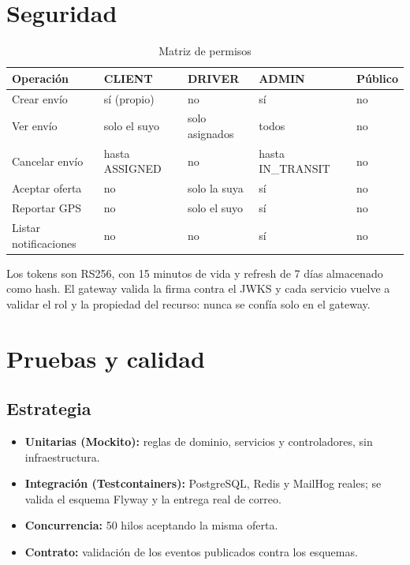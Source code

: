 \documentclass[conference]{IEEEtran}
\begin{document}
\section{Seguridad}

\begin{table}[t]
\centering
\caption{Matriz de permisos}
\small
\begin{tabular}{@{}L{5.6cm}L{2.2cm}L{2.2cm}L{2.2cm}L{2.2cm}@{}}
\toprule
\textbf{Operación} & \textbf{CLIENT} & \textbf{DRIVER} & \textbf{ADMIN} & \textbf{Público}\\
\midrule
Crear envío & sí (propio) & no & sí & no\\
Ver envío & solo el suyo & solo asignados & todos & no\\
Cancelar envío & hasta ASSIGNED & no & hasta IN\_TRANSIT & no\\
Aceptar oferta & no & solo la suya & sí & no\\
Reportar GPS & no & solo el suyo & sí & no\\
Listar notificaciones & no & no & sí & no\\
\bottomrule
\end{tabular}
\end{table}

Los tokens son RS256, con 15 minutos de vida y refresh de 7 días almacenado como hash. El gateway
valida la firma contra el JWKS y cada servicio vuelve a validar el rol y la propiedad del recurso:
nunca se confía solo en el gateway.

\clearpage
\section{Pruebas y calidad}

\subsection{Estrategia}

\begin{itemize}[leftmargin=1.2cm]
  \item \textbf{Unitarias (Mockito):} reglas de dominio, servicios y controladores, sin
        infraestructura.
  \item \textbf{Integración (Testcontainers):} PostgreSQL, Redis y MailHog reales; se valida el
        esquema Flyway y la entrega real de correo.
  \item \textbf{Concurrencia:} 50 hilos aceptando la misma oferta.
  \item \textbf{Contrato:} validación de los eventos publicados contra los esquemas.
\end{itemize}
\end{document}
